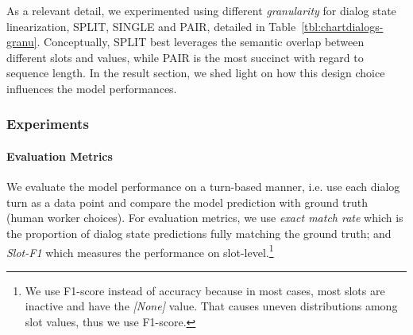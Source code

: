 \documentclass[11pt,dvipdfm]{article}
\begin{document}
As a relevant detail, we experimented using different \textit{granularity} for dialog state linearization, SPLIT, SINGLE and PAIR, detailed in Table~\ref{tbl:chartdialogs-granu}. Conceptually, SPLIT best leverages the semantic overlap between different slots and values, while PAIR is the most succinct with regard to sequence length. In the result section, we shed light on how this design choice influences the model performances.


\begin{table}[h]
\centering
{}
\caption{Explanation of dialog state linearization granularity.}
\label{tbl:chartdialogs-granu}
\end{table}


\subsubsection{Experiments}
\paragraph{Evaluation Metrics} We evaluate the model performance on a turn-based manner, i.e. use each dialog turn as a data point and compare the model prediction with ground truth (human worker choices). For evaluation metrics, we use \textit{exact match rate} which is the proportion of dialog state predictions fully matching the ground truth; and \textit{Slot-F1} which measures the performance on slot-level.\footnote{We use F1-score instead of accuracy because in most cases, most slots are inactive and have the \textit{[None]} value. That causes uneven distributions among slot values, thus we use F1-score.}
\end{document}
